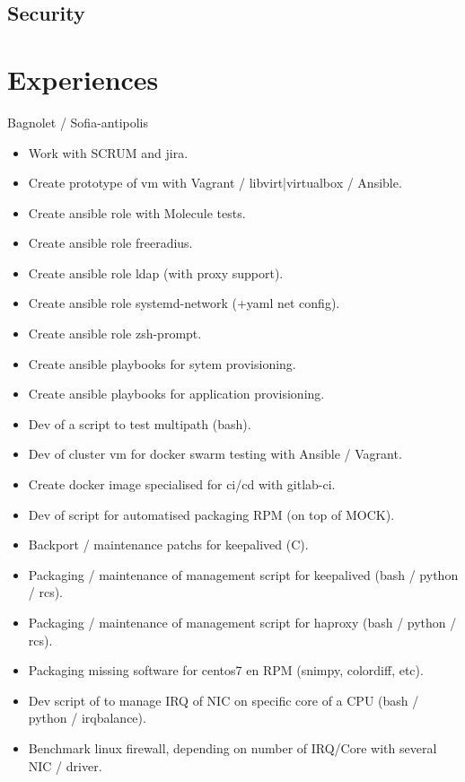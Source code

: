 \documentclass[10pt,a4paper,sans]{moderncv}
\begin{document}
\subsection{Security}

\section{Experiences}

{Bagnolet / Sofia-antipolis}{
  \begin{itemize}%
    \item Work with SCRUM and jira.
    \item Create prototype of vm with Vagrant / libvirt|virtualbox / Ansible.
    \item Create ansible role with  Molecule tests.
    \item Create ansible role freeradius.
    \item Create ansible role ldap (with proxy support).
    \item Create ansible role systemd-network (+yaml net config).
    \item Create ansible role zsh-prompt.
    \item Create ansible playbooks for sytem provisioning.
    \item Create ansible playbooks for application provisioning.
    \item Dev of a script to test multipath (bash).
    \item Dev of cluster vm for docker swarm testing with Ansible / Vagrant.
    \item Create docker image specialised for ci/cd with gitlab-ci.
    \item Dev of script for automatised packaging RPM (on top of MOCK).
    \item Backport / maintenance patchs for keepalived (C).
    \item Packaging / maintenance of management script for keepalived (bash / python / rcs).
    \item Packaging / maintenance of management script for haproxy (bash / python / rcs).
    \item Packaging missing software for centos7 en RPM (snimpy, colordiff, etc).
    \item Dev script of to manage IRQ of NIC on specific core of a CPU (bash / python / irqbalance).
    \item Benchmark linux firewall, depending on number of IRQ/Core with several NIC / driver.

\end{itemize}}
\end{document}

